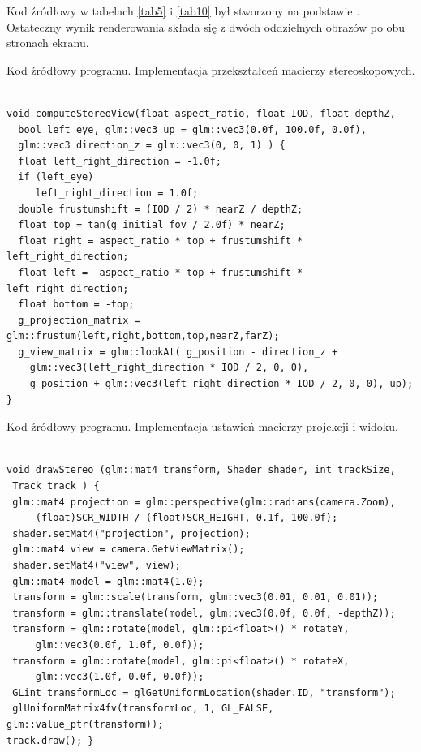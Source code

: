 Kod źródłowy w tabelach \ref{tab5} i \ref{tab10} był stworzony na podstawie \cite{openglCookbook}. Ostateczny wynik renderowania składa się z dwóch oddzielnych obrazów po obu stronach ekranu.

\newpage
\begin{table}[H]
\caption{Kod źródłowy programu. Implementacja przekształceń macierzy stereoskopowych.}
\label{tab5}
\begin{lstlisting}[frame=single]  % Start your code-block

void computeStereoView(float aspect_ratio, float IOD, float depthZ, 
  bool left_eye, glm::vec3 up = glm::vec3(0.0f, 100.0f, 0.0f), 
  glm::vec3 direction_z = glm::vec3(0, 0, 1) ) {
  float left_right_direction = -1.0f;
  if (left_eye)
     left_right_direction = 1.0f;
  double frustumshift = (IOD / 2) * nearZ / depthZ;
  float top = tan(g_initial_fov / 2.0f) * nearZ;
  float right = aspect_ratio * top + frustumshift * left_right_direction;
  float left = -aspect_ratio * top + frustumshift * left_right_direction;
  float bottom = -top;
  g_projection_matrix = glm::frustum(left,right,bottom,top,nearZ,farZ);
  g_view_matrix = glm::lookAt( g_position - direction_z + 
  	glm::vec3(left_right_direction * IOD / 2, 0, 0),
    g_position + glm::vec3(left_right_direction * IOD / 2, 0, 0), up); }
\end{lstlisting}
\end{table}
\begin{table}[H]
\caption{Kod źródłowy programu. Implementacja ustawień macierzy projekcji i widoku.}
\label{tab10}
\begin{lstlisting}[frame=single]  % Start your code-block

void drawStereo (glm::mat4 transform, Shader shader, int trackSize,
 Track track ) {
 glm::mat4 projection = glm::perspective(glm::radians(camera.Zoom),
     (float)SCR_WIDTH / (float)SCR_HEIGHT, 0.1f, 100.0f);
 shader.setMat4("projection", projection);
 glm::mat4 view = camera.GetViewMatrix();
 shader.setMat4("view", view);
 glm::mat4 model = glm::mat4(1.0);
 transform = glm::scale(transform, glm::vec3(0.01, 0.01, 0.01));
 transform = glm::translate(model, glm::vec3(0.0f, 0.0f, -depthZ));
 transform = glm::rotate(model, glm::pi<float>() * rotateY, 
     glm::vec3(0.0f, 1.0f, 0.0f));
 transform = glm::rotate(model, glm::pi<float>() * rotateX, 
     glm::vec3(1.0f, 0.0f, 0.0f));
 GLint transformLoc = glGetUniformLocation(shader.ID, "transform");
 glUniformMatrix4fv(transformLoc, 1, GL_FALSE, glm::value_ptr(transform));
track.draw(); }
\end{lstlisting}
\end{table}


